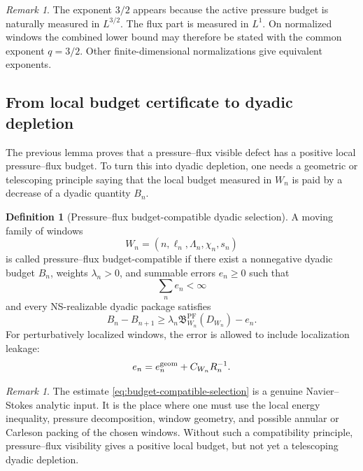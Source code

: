 \documentclass[11pt]{article}
\numberwithin{equation}{section}
\theoremstyle{plain}
\theoremstyle{definition}
\newtheorem{definition}[theorem]{Definition}
\theoremstyle{remark}
\newtheorem{remark}[theorem]{Remark}
\newcommand{\PF}{\mathrm{PF}}
\newcommand{\bfB}{\mathfrak B}
\begin{document}
\begin{remark}
The exponent \(3/2\) appears because the active pressure budget is naturally measured in \(L^{3/2}\).  The flux part is measured in \(L^1\).  On normalized windows the combined lower bound may therefore be stated with the common exponent \(q=3/2\).  Other finite-dimensional normalizations give equivalent exponents.
\end{remark}

\subsection{From local budget certificate to dyadic depletion}

The previous lemma proves that a pressure--flux visible defect has a positive local pressure--flux budget.  To turn this into dyadic depletion, one needs a geometric or telescoping principle saying that the local budget measured in \(W_n\) is paid by a decrease of a dyadic quantity \(B_n\).

\begin{definition}[Pressure--flux budget-compatible dyadic selection]
\label{def:pf-budget-compatible-selection}
A moving family of windows
\[
        W_n=(n,\ell_n,\Lambda_n,\chi_n,s_n)
\]
is called pressure--flux budget-compatible if there exist a nonnegative dyadic budget \(B_n\), weights \(\lambda_n>0\), and summable errors \(e_n\ge0\) such that
\[
        \sum_n e_n<\infty
\]
and every NS-realizable dyadic package satisfies
\begin{equation}
        B_n-B_{n+1}
        \ge
        \lambda_n\bfB^{\PF}_{W_n}(D_{W_n})-e_n.
        \label{eq:budget-compatible-selection}
\end{equation}
For perturbatively localized windows, the error is allowed to include localization leakage:
\[
        e_n=e_n^{\rm geom}+C_{W_n}R_n^{-1}.
\]
\end{definition}

\begin{remark}
The estimate \eqref{eq:budget-compatible-selection} is a genuine Navier--Stokes analytic input.  It is the place where one must use the local energy inequality, pressure decomposition, window geometry, and possible annular or Carleson packing of the chosen windows.  Without such a compatibility principle, pressure--flux visibility gives a positive local budget, but not yet a telescoping dyadic depletion.
\end{remark}
\end{document}
